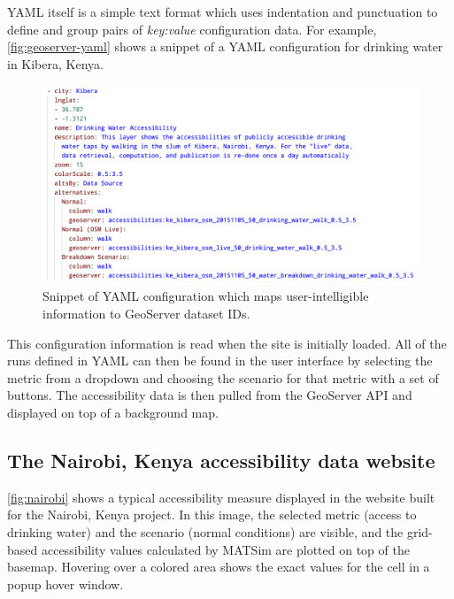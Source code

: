 YAML itself is a simple text format which uses indentation and punctuation to define and group pairs of \emph{key:value} configuration data. For example, \autoref{fig:geoserver-yaml} shows a snippet of a YAML configuration for drinking water in Kibera, Kenya.

\begin{figure}[!ht]
  \includegraphics[width=\textwidth]{chapters/12-server-experiments/images/geoserver-yaml.png}
  \caption[GeoServer YAML configuration example]{Snippet of YAML configuration which maps user-intelligible information to GeoServer dataset IDs.}
  \label{fig:geoserver-yaml}
\end{figure}

This configuration information is read when the site is initially loaded. All of the runs defined in YAML can then be found in the user interface by selecting the metric from a dropdown and choosing the scenario for that metric with a set of buttons. The accessibility data is then pulled from the GeoServer API and displayed on top of a background map.

\hypertarget{server-experiments-geoserver-3}{%
\subsection{The Nairobi, Kenya accessibility data website}
\label{server-experiments-geoserver-3}}

\autoref{fig:nairobi} shows a typical accessibility measure displayed in the website built for the Nairobi, Kenya project. In this image, the selected metric (access to drinking water) and the scenario (normal conditions) are visible, and the grid-based accessibility values calculated by MATSim are plotted on top of the basemap. Hovering over a colored area shows the exact values for the cell in a popup hover window.

